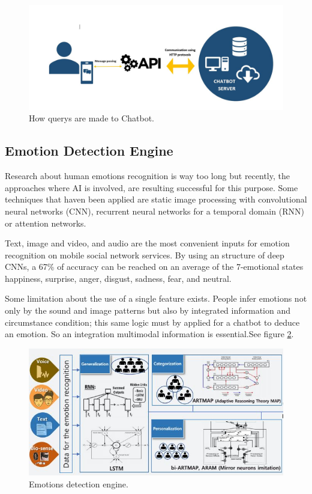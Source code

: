 \documentclass[	DIV=calc,%
							paper=letter,%
							fontsize=12pt%
                            ]{scrartcl}	 					%
\begin{document}
\begin{figure}[H]
\centering
\includegraphics[scale=0.5]{img/ChatbotWorking.JPG}
\caption{How querys are made to Chatbot. \cite{rahman2017programming_08288910}}
\label{fig:ChatbotQuery}
\end{figure}


\subsection{\label{sec:level1}Emotion Detection Engine}
Research about human emotions recognition is way too long but recently, the approaches where AI is involved, are resulting successful for this purpose. Some techniques that haven been applied are static image processing with convolutional neural networks (CNN)\cite {kim2016hierarchical}, recurrent neural networks for a temporal domain (RNN)\cite{ chao2016audio} or attention networks\cite{ lee2012towards }. 

 
Text, image and video, and audio are the most convenient inputs for emotion recognition on mobile social network services. By using an structure of deep CNNs, a 67\% of accuracy can be reached on an average of the 7-emotional states happiness, surprise, anger, disgust, sadness, fear, and neutral.\cite{lee2017chatbot_07881752}\cite{oh2017chatbot_0796482}


Some limitation about the use of a single feature exists. People infer emotions not only by the sound and image patterns but also by integrated information and circumstance condition; this same logic must by applied for a chatbot to deduce an emotion. So an integration multimodal information is essential.See figure \ref{RNN}.\cite{lee2017chatbot_07881752}

\begin{figure}[H]
\centering
\includegraphics[scale=1]{img/emotionsDetection.JPG}
\caption{Emotions detection engine. \cite{lee2017chatbot_07881752}}
\label{RNN}
\end{figure}
\end{document}
